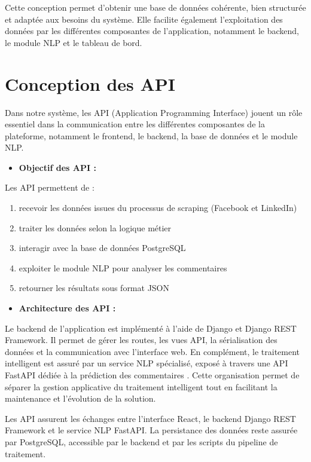\documentclass[12pt,a4paper,oneside]{report}
\begin{document}
Cette conception permet d’obtenir une base de données cohérente, bien structurée et adaptée aux besoins du système. Elle facilite également l’exploitation des données par les différentes composantes de l’application, notamment le backend, le module NLP et le tableau de bord.
\section{Conception des API}
Dans notre système, les API (Application Programming Interface) jouent un rôle essentiel dans la communication entre les différentes composantes de la plateforme, notamment le frontend, le backend, la base de données et le module NLP.
\clearpage
\begin{itemize}
    \item \textbf{Objectif des API :}
\end{itemize}
\vspace{0.3cm}
Les API permettent de :

\begin{enumerate}
    \item recevoir les données issues du processus de scraping (Facebook et LinkedIn) 
    \item traiter les données selon la logique métier
    \item interagir avec la base de données PostgreSQL
    \item exploiter le module NLP pour analyser les commentaires
    \item retourner les résultats sous format JSON
\end{enumerate}

\begin{itemize}
    \item \textbf{Architecture des API :}
\end{itemize}
\vspace{0.3cm}
Le backend de l’application est implémenté à l’aide de Django et Django REST Framework. Il permet de gérer les routes, les vues API, la sérialisation des données et la communication avec l’interface web. En complément, le traitement intelligent est assuré par un service NLP spécialisé, exposé à travers une API FastAPI dédiée à la prédiction des commentaires \cite{drf,fastapi}. Cette organisation permet de séparer la gestion applicative du traitement intelligent tout en facilitant la maintenance et l’évolution de la solution.

Les API assurent les échanges entre l’interface React, le backend Django REST Framework et le service NLP FastAPI. La persistance des données reste assurée par PostgreSQL, accessible par le backend et par les scripts du pipeline de traitement.
\end{document}
